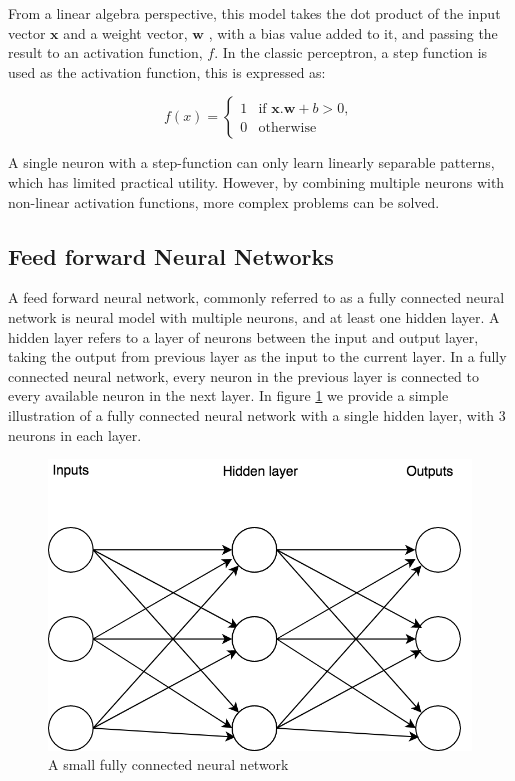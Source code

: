 From a linear algebra perspective, this model takes the dot product of the input vector $\mathbf{x}$ and a weight vector, $\mathbf{w}$ , with a bias value added to it, and passing the result to an activation function, $f$. In the classic perceptron, a step function is used as the activation function, this is expressed as:

\begin{equation}
	f(x) =
	\begin{cases}
	1 & \text{if $\mathbf{x} . \mathbf{w} + b > 0$},   \\
	0 & \text{otherwise}
	\end{cases}
\end{equation}

A single neuron with a step-function can only learn linearly separable patterns, which has limited practical utility. However, by combining multiple neurons with non-linear activation functions, more complex problems can be solved.


\subsection{Feed forward Neural Networks}

A feed forward neural network, commonly referred to as a fully connected neural network is neural model with multiple neurons, and at least one hidden layer. A hidden layer refers to a layer of neurons between the input and output layer, taking the output from previous layer as the input to the current layer. In a fully connected neural network, every neuron in the previous layer is connected to every available neuron in the next layer. In figure \ref{fig:feedforward} we provide a simple illustration of a fully connected neural network with a single hidden layer,  with 3 neurons in each layer.


\begin{figure}[H]
	\centering
	\includegraphics[width=0.7\linewidth]{images/chapter_2/feed_forward}
	\caption{A small fully connected neural network}
	\label{fig:feedforward}
\end{figure}


